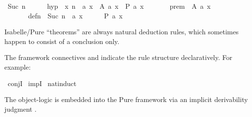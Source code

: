 \begin{isabellebody}
\ {}Suc\ n{}\isanewline
\ \ \ \ \isamarkupfalse%
\ hyp\ {}\ {}{}x{}\ n\ {}\ a\ x\ {}\ A\ {}a\ x{}\ {}\ P\ {}a\ x{}{}\isanewline
\ \ \ \ \ \ \ prem\ {}\ {}A\ {}a\ x{}{}\isanewline
\ \ \ \ \ \ \ defn\ {}\ {}Suc\ n\ {}\ a\ x{}\isanewline
\ \ \ \ \isamarkupfalse%
\ {}P\ {}a\ x{}{}\ \isamarkupfalse%
\isanewline
\ \ \isamarkupfalse%
%
\endisatagproof
{\isafoldproof}%
%
\isadelimproof
\isanewline
%
\endisadelimproof
{}\isamarkupfalse%
%
\isamarkuptrue%
%
\isamarkuptrue%
%
\begin{isamarkuptext}%
Isabelle/Pure ``theorems'' are always natural deduction rules,
  which sometimes happen to consist of a conclusion only.

  The framework connectives  and  indicate the
  rule structure declaratively.  For example:%
\end{isamarkuptext}%
\isamarkuptrue%
\isamarkupfalse%
\ conjI\isanewline
{}\isamarkupfalse%
\ impI\isanewline
{}\isamarkupfalse%
\ nat{}induct%
\begin{isamarkuptext}%
The object-logic is embedded into the Pure framework via an implicit
  derivability judgment .


\end{isamarkuptext}
\end{isabellebody}
